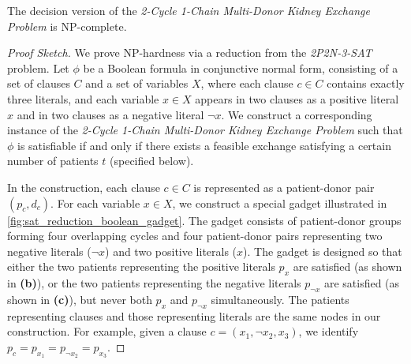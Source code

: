 \begin{lemma}
\label{lemma:2c1c_npc}
The decision version of the \textit{2-Cycle 1-Chain Multi-Donor Kidney Exchange Problem} is NP-complete.
\end{lemma}

\begin{proof}[Proof Sketch]
We prove NP-hardness via a reduction from the \textit{2P2N-3-SAT} problem. Let $\phi$ be a Boolean formula in conjunctive normal form, consisting of a set of clauses $C$ and a set of variables $X$, where each clause $c \in C$ contains exactly three literals, and each variable $x \in X$ appears in two clauses as a positive literal $x$ and in two clauses as a negative literal $\neg{x}$. We construct a corresponding instance of the \textit{2-Cycle 1-Chain Multi-Donor Kidney Exchange Problem} such that $\phi$ is satisfiable if and only if there exists a feasible exchange satisfying a certain number of patients $t$ (specified below).

In the construction, each clause $c \in C$ is represented as a patient-donor pair $(p_c, d_c)$. For each variable $x \in X$, we construct a special gadget illustrated in \autoref{fig:sat_reduction_boolean_gadget}. The gadget consists of patient-donor groups forming four overlapping cycles and four patient-donor pairs representing two negative literals ($\neg{x}$) and two positive literals ($x$). The gadget is designed so that either the two patients representing the positive literals $p_x$ are satisfied (as shown in \textbf{(b)}), or the two patients representing the negative literals $p_{\neg{x}}$ are satisfied (as shown in \textbf{(c)}), but never both $p_x$ and $p_{\neg{x}}$ simultaneously. The patients representing clauses and those representing literals are the same nodes in our construction. For example, given a clause $c = (x_1, \neg{x_2}, x_3)$, we identify $p_c = p_{x_1} = p_{\neg{x_2}} = p_{x_3}$.


\end{proof}
